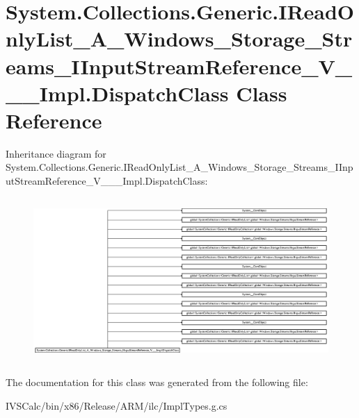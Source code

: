 \hypertarget{class_system_1_1_collections_1_1_generic_1_1_i_read_only_list___a___windows___storage___streams_fc34f3f86d5f0de55e045832ff1eaff3}{}\section{System.\+Collections.\+Generic.\+I\+Read\+Only\+List\+\_\+\+A\+\_\+\+Windows\+\_\+\+Storage\+\_\+\+Streams\+\_\+\+I\+Input\+Stream\+Reference\+\_\+\+V\+\_\+\+\_\+\+\_\+\+Impl.\+Dispatch\+Class Class Reference}
\label{class_system_1_1_collections_1_1_generic_1_1_i_read_only_list___a___windows___storage___streams_fc34f3f86d5f0de55e045832ff1eaff3}
Inheritance diagram for System.\+Collections.\+Generic.\+I\+Read\+Only\+List\+\_\+\+A\+\_\+\+Windows\+\_\+\+Storage\+\_\+\+Streams\+\_\+\+I\+Input\+Stream\+Reference\+\_\+\+V\+\_\+\+\_\+\+\_\+\+Impl.\+Dispatch\+Class\+:\begin{figure}[H]
\begin{center}
\leavevmode
\includegraphics[height=6.300984cm]{class_system_1_1_collections_1_1_generic_1_1_i_read_only_list___a___windows___storage___streams_fc34f3f86d5f0de55e045832ff1eaff3}
\end{center}
\end{figure}


The documentation for this class was generated from the following file\+:\begin{DoxyCompactItemize}
\item 
I\+V\+S\+Calc/bin/x86/\+Release/\+A\+R\+M/ilc/Impl\+Types.\+g.\+cs\end{DoxyCompactItemize}
